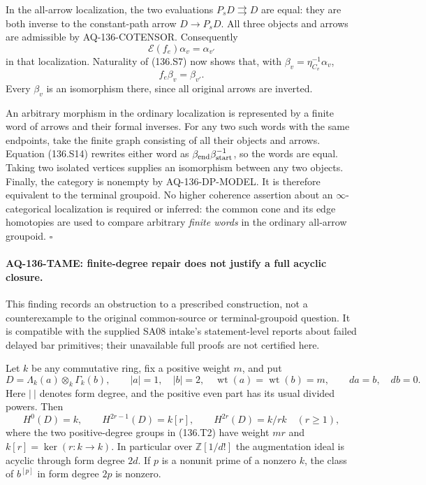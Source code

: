 In the all-arrow localization, the two evaluations
$P_sD\rightrightarrows D$ are equal: they are both
inverse to the constant-path arrow $D\to P_sD$.
All three objects and arrows are admissible by
AQ-136-COTENSOR. Consequently
\[
                   \mathcal E(f_e)\alpha_v=\alpha_{v'}
\]
in that localization. Naturality of (136.S7) now
shows that, with $\beta_v=\eta_{C_v}^{-1}\alpha_v$,
\[
                               f_e\beta_v=\beta_{v'}.
                                                               \tag{136.S14}
\]
Every $\beta_v$ is an isomorphism there, since all
original arrows are inverted.

An arbitrary morphism in the ordinary localization
is represented by a finite word of arrows and
their formal inverses. For any two such words with
the same endpoints, take the finite graph consisting
of all their objects and arrows. Equation (136.S14)
rewrites either word as
$\beta_{\rm end}\beta_{\rm start}^{-1}$, so the words
are equal. Taking two isolated vertices supplies
an isomorphism between any two objects. Finally,
the category is nonempty by AQ-136-DP-MODEL.
It is therefore equivalent to the terminal groupoid.
No higher coherence assertion about an
$\infty$-categorical localization is required or
inferred: the common cone and its edge homotopies
are used to compare arbitrary \emph{finite words}
in the ordinary all-arrow groupoid. \hfill$\square$


\paragraph{AQ-136-TAME: finite-degree repair does not justify a full acyclic closure.}
This finding records an obstruction to a prescribed construction,
not a counterexample to the original common-source or terminal-groupoid
question. It is compatible with the supplied SA08 intake's
statement-level reports about failed delayed bar primitives; their
unavailable full proofs are not certified here.

Let $k$ be any commutative ring, fix a positive weight $m$, and put
\[
 D=\Lambda_k(a)\otimes_k\Gamma_k(b),\qquad
 |a|=1,\quad |b|=2,\quad \operatorname{wt}(a)=\operatorname{wt}(b)=m,
 \qquad da=b,\quad db=0.                                  \tag{136.T1}
\]
Here $|\ |$ denotes form degree, and the positive even part has
its usual divided powers. Then
\[
 H^0(D)=k,\qquad
 H^{2r-1}(D)=k[r],\qquad H^{2r}(D)=k/rk\quad(r\ge1),         \tag{136.T2}
\]
where the two positive-degree groups in (136.T2) have weight
$mr$ and $k[r]=\ker(r:k\to k)$. In particular over
$\mathbb Z[1/d!]$ the augmentation ideal is acyclic through
form degree $2d$. If $p$ is a nonunit prime of a nonzero $k$,
the class of $b^{[p]}$ in form degree $2p$ is nonzero.

